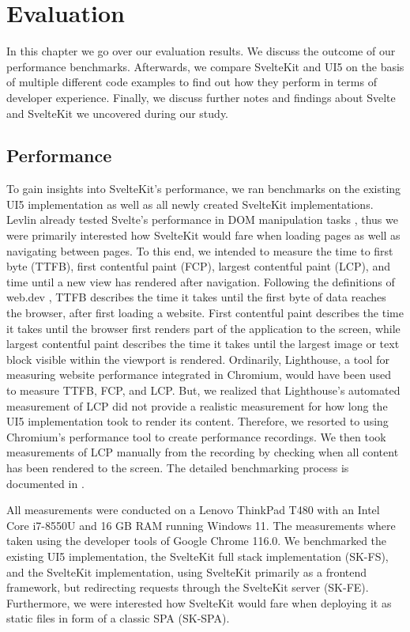 \chapter{Evaluation}
\label{ch:evaluation}
In this chapter we go over our evaluation results. We discuss the outcome of our performance benchmarks. Afterwards, we compare SvelteKit and UI5 on the basis of multiple different code examples to find out how they perform in terms of developer experience. Finally, we discuss further notes and findings about Svelte and SvelteKit we uncovered during our study.

\section{Performance}
\label{sec:evaluation-performance}
To gain insights into SvelteKit's performance, we ran benchmarks on the existing UI5 implementation as well as all newly created SvelteKit implementations. Levlin already tested Svelte's performance in DOM manipulation tasks \cite{levlin_dom_2020}, thus we were primarily interested how SvelteKit would fare when loading pages as well as navigating between pages. To this end, we intended to measure the time to first byte (TTFB), first contentful paint (FCP), largest contentful paint (LCP), and time until a new view has rendered after navigation. Following the definitions of web.dev \cite{noauthor_webdev_nodate}, TTFB describes the time it takes until the first byte of data reaches the browser, after first loading a website. First contentful paint describes the time it takes until the browser first renders part of the application to the screen, while largest contentful paint describes the time it takes until the largest image or text block visible within the viewport is rendered. Ordinarily, Lighthouse, a tool for measuring website performance integrated in Chromium, would have been used to measure TTFB, FCP, and LCP. But, we realized that Lighthouse's automated measurement of LCP did not provide a realistic measurement for how long the UI5 implementation took to render its content. Therefore, we resorted to using Chromium's performance tool to create performance recordings. We then took measurements of LCP manually from the recording by checking when all content has been rendered to the screen. The detailed benchmarking process is documented in .  

All measurements were conducted on a Lenovo ThinkPad T480 with an Intel Core i7-8550U and 16 GB RAM running Windows 11. The measurements where taken using the developer tools of Google Chrome 116.0. We benchmarked the existing UI5 implementation, the SvelteKit full stack implementation (SK-FS), and the SvelteKit implementation, using SvelteKit primarily as a frontend framework, but redirecting requests through the SvelteKit server (SK-FE). Furthermore, we were interested how SvelteKit would fare when deploying it as static files in form of a classic SPA (SK-SPA). 

